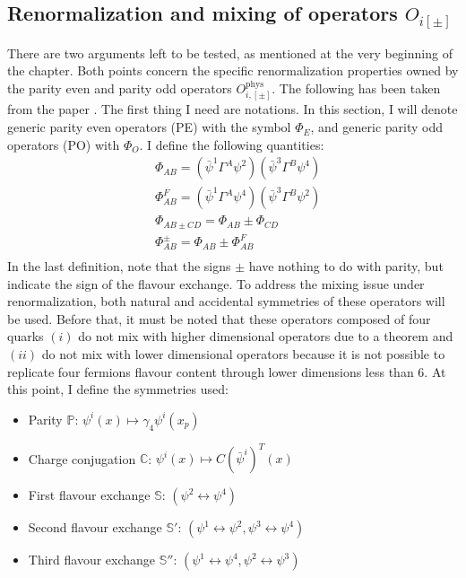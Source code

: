 \documentclass[english, LaM, oneside, noexaminfo]{sapthesis}
\begin{document}
\subsection{Renormalization and mixing of operators $O_{i[\pm]}$}\label{sec:renormalization-properties}
\noindent
There are two arguments left to be tested, as mentioned at the very beginning of the chapter.
Both points concern the specific renormalization properties owned by the parity even and parity odd operators $O_{i,[\pm]}^\text{phys}$.
The following has been taken from the paper \cite{DoniniMartinelliOperators}.
\newline
The first thing I need are notations.
In this section, I will denote generic parity even operators (PE) with the symbol $\Phi_{E}$, and generic parity odd operators (PO) with $\Phi_{O}$.
I define the following quantities:
\begin{equation*}
    \begin{split}
        & \Phi_{AB} = \left( \bar \psi^1 \Gamma^A \psi^2 \right) \left( \bar \psi^3 \Gamma^B \psi^4 \right) \\
        & \Phi_{AB}^F = \left( \bar \psi^1 \Gamma^A \psi^4 \right) \left( \bar \psi^3 \Gamma^B \psi^2 \right) \\
        & \Phi_{AB \pm CD} = \Phi_{AB} \pm \Phi_{CD} \\
        & \Phi_{AB}^\pm = \Phi_{AB} \pm \Phi_{AB}^F \\
    \end{split}
\end{equation*}
In the last definition, note that the signs $\pm$ have nothing to do with parity, but indicate the sign of the flavour exchange.
\newline
To address the mixing issue under renormalization, both natural and accidental symmetries of these operators will be used.
Before that, it must be noted that these operators composed of four quarks
$(i)$ do not mix with higher dimensional operators due to a theorem \cite{Collins} and
$(ii)$ do not mix with lower dimensional operators because it is not possible to replicate four fermions flavour content through lower dimensions less than 6.
At this point, I define the symmetries used:
\begin{itemize}
    \item Parity $\mathbb{P}$: $\psi^i (x) \mapsto \gamma_4 \psi^i (x_p)$
    \item Charge conjugation $\mathbb{C}$: $\psi^i (x) \mapsto C \left(\bar\psi^{i}\right)^T (x)$
    \item First flavour exchange $\mathbb{S}$: $(\psi^2 \leftrightarrow \psi^4)$
    \item Second flavour exchange $\mathbb{S}'$: $(\psi^1 \leftrightarrow \psi^2, \psi^3 \leftrightarrow \psi^4)$
    \item Third flavour exchange $\mathbb{S}''$: $(\psi^1 \leftrightarrow \psi^4, \psi^2 \leftrightarrow \psi^3)$
\end{itemize}
\end{document}
